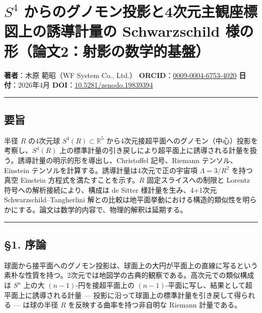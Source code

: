 \documentclass[a4paper,11pt]{ltjsarticle}
\theoremstyle{definition}
\begin{document}
\section{\texorpdfstring{\(S^4\)
からのグノモン投影と4次元主観座標図上の誘導計量の Schwarzschild
様の形（論文2：射影の数学的基盤）}{S\^{}4 からのグノモン投影と4次元主観座標図上の誘導計量の Schwarzschild 様の形（論文2：射影の数学的基盤）}}\label{s4-ux304bux3089ux306eux30b0ux30ceux30e2ux30f3ux6295ux5f71ux30684ux6b21ux5143ux4e3bux89b3ux5ea7ux6a19ux56f3ux4e0aux306eux8a98ux5c0eux8a08ux91cfux306e-schwarzschild-ux69d8ux306eux5f62ux8ad6ux65872ux5c04ux5f71ux306eux6570ux5b66ux7684ux57faux76e4}

\textbf{著者}：木原 範昭（WF System Co., Ltd.）
\textbf{ORCID}：\href{https://orcid.org/0009-0004-6753-4020}{0009-0004-6753-4020}
\textbf{日付}：2026年4月
\textbf{DOI}：\href{https://doi.org/10.5281/zenodo.19839394}{10.5281/zenodo.19839394}

\begin{center}\rule{0.5\linewidth}{0.5pt}\end{center}

\subsection{要旨}\label{ux8981ux65e8}

半径 \(R\) の4次元球 \(S^4(R) \subset \mathbb{R}^5\)
から4次元接超平面へのグノモン（中心）投影を考察し、\(S^4(R)\)
上の標準計量の引き戻しにより超平面上に誘導される計量を扱う。誘導計量の明示的形を導出し、Christoffel
記号、Riemann テンソル、Einstein
テンソルを計算する。誘導計量は4次元で正の宇宙項 \(\Lambda = 3/R^2\)
を持つ真空 Einstein 方程式を満たすことを示す。\(R\)
固定スライスへの制限と Lorentz 符号への解析接続により、構成は de Sitter
様計量を生み、4+1次元 Schwarzschild--Tangherlini
解との比較は地平面挙動における構造的類似性を明らかにする。論文は数学的内容で、物理的解釈は延期する。

\begin{center}\rule{0.5\linewidth}{0.5pt}\end{center}

\subsection{§1. 序論}\label{ux5e8fux8ad6}

球面から接平面へのグノモン投影は、球面上の大円が平面上の直線に写るという素朴な性質を持つ。2次元では地図学の古典的観察である。高次元での類似構成は
\(S^n\) 上の大 \((n-1)\)-円を接超平面上の
\((n-1)\)-平面に写し、結果として超平面上に誘導される計量 ---
投影に沿って球面上の標準計量を引き戻して得られる --- は球の半径 \(R\)
を反映する曲率を持つ非自明な Riemann 計量である。
\end{document}
